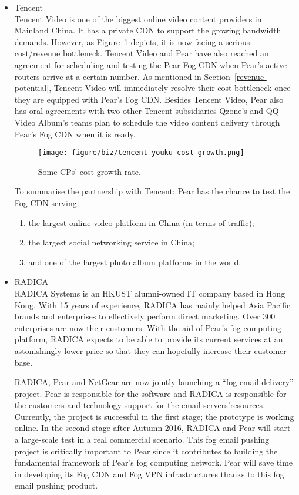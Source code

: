 \begin{itemize}
	\item Tencent\\
	Tencent Video is one of the biggest online video content providers in Mainland China. It has a private CDN to support the growing bandwidth demands. However, as Figure~\ref{fig:tencent-youku-cost-growth} depicts, it is now facing a serious cost/revenue bottleneck. Tencent Video and Pear have also reached an agreement for scheduling and testing the Pear Fog CDN when Pear's active routers arrive at a certain number. As mentioned in Section~\ref{revenue-potential}, Tencent Video will immediately resolve their cost bottleneck once they are equipped with Pear's Fog CDN.
	Besides Tencent Video, Pear also has oral agreements with two other Tencent subsidiaries Qzone's and QQ Video Album's teams plan to schedule the video content delivery through Pear's Fog CDN when it is ready.
	\begin{figure}[ht]
		\centering
		\texttt{[image: figure/biz/tencent-youku-cost-growth.png]}
		\caption{Some CPs' cost growth rate.} \label{fig:tencent-youku-cost-growth}
	\end{figure}
	
	To summarise the partnership with Tencent: Pear has the chance to test the Fog CDN serving:
	\begin{enumerate}
		\item the largest online video platform in China (in terms of traffic); 
		\item the largest social networking service in China;
		\item and one of the largest photo album platforms in the world.
	\end{enumerate}
	
	\item RADICA\\
	RADICA Systems is an HKUST alumni-owned IT company based in Hong Kong. With 15 years of experience, RADICA has mainly helped Asia Pacific brands and enterprises to effectively perform direct marketing. Over 300 enterprises are now their customers. With the aid of Pear's fog computing platform, RADICA expects to be able to provide its current services at an astonishingly lower price so that they can hopefully increase their customer base.
	
	RADICA, Pear and NetGear are now jointly launching a ``fog email delivery'' project. Pear is responsible for the software and RADICA is responsible for the customers and technology support for the email servers'resources. Currently, the project is successful in the first stage; the prototype is working online. In the second stage after Autumn 2016, RADICA and Pear will start a large-scale test in a real commercial scenario. This fog email pushing project is critically important to Pear since it contributes to building the fundamental framework of Pear's fog computing network. Pear will save time in developing its Fog CDN and Fog VPN infrastructures thanks to this fog email pushing product. 
\end{itemize}

